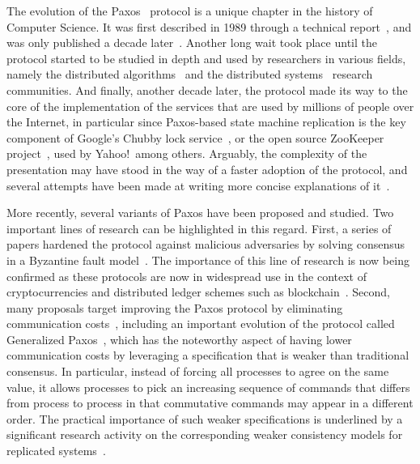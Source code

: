 The evolution of the Paxos~\cite{paxos:tocs} protocol is a unique
chapter in the history of Computer Science. It was first described in
1989 through a technical report~\cite{paxos:tr}, and was only
published a decade later~\cite{paxos:tocs}. Another long wait took
place until the protocol started to be studied in depth and used by
researchers in various fields, namely the distributed
algorithms~\cite{deprisco} and the distributed systems~\cite{petal}
research communities. And finally, another decade later, the protocol
made its way to the core of the implementation of the services that
are used by millions of people over the Internet, in particular since
Paxos-based state machine replication is the key component of Google's
Chubby lock service~\cite{chubby}, or the open source ZooKeeper
project~\cite{zookeeper}, used by Yahoo!\ among others. Arguably, the
complexity of the presentation may have stood in the way of a faster
adoption of the protocol, and several attempts have been made at
writing more concise explanations of
it~\cite{paxos:simple,paxos:moderatelycomplex}.


More recently, several variants of Paxos have been proposed and
studied. Two important lines of research can be highlighted in this
regard. First, a series of papers hardened the protocol against
malicious adversaries by solving consensus in a Byzantine fault
model~\cite{pbft, byz:paxos}. The importance of this line of
research is now being confirmed as these protocols are now in widespread
use in the context of cryptocurrencies and distributed ledger
schemes such as blockchain~\cite{blockchain}.
Second, many proposals target improving
the Paxos protocol by eliminating communication costs~\cite{fastpaxos},
including an important evolution of the protocol called Generalized
Paxos~\cite{generalized:paxos}, which has the noteworthy aspect of
having lower communication costs by leveraging a specification that is
weaker than traditional consensus. In particular, instead of forcing all
processes to agree on the same value, it allows processes to pick an
increasing sequence of commands that differs from process to process
in that commutative commands may appear in a different order.
The practical importance of such weaker specifications is underlined
by a significant research activity on the corresponding weaker consistency
models for replicated systems~\cite{weakconsistency}.


